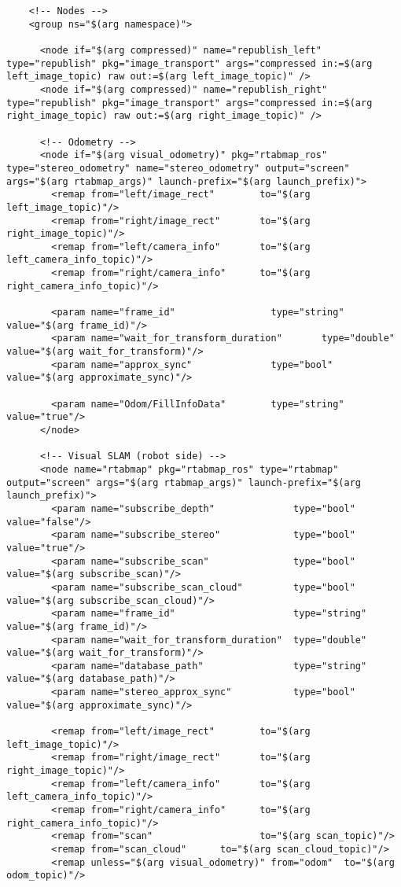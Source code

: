 \begin{center}
\begin{footnotesize}
\begin{verbatim}
    <!-- Nodes -->
    <group ns="$(arg namespace)">
    
      <node if="$(arg compressed)" name="republish_left"  type="republish" pkg="image_transport" args="compressed in:=$(arg left_image_topic) raw out:=$(arg left_image_topic)" />
      <node if="$(arg compressed)" name="republish_right" type="republish" pkg="image_transport" args="compressed in:=$(arg right_image_topic) raw out:=$(arg right_image_topic)" />
    
      <!-- Odometry -->
      <node if="$(arg visual_odometry)" pkg="rtabmap_ros" type="stereo_odometry" name="stereo_odometry" output="screen" args="$(arg rtabmap_args)" launch-prefix="$(arg launch_prefix)">
        <remap from="left/image_rect"        to="$(arg left_image_topic)"/>
        <remap from="right/image_rect"       to="$(arg right_image_topic)"/>
        <remap from="left/camera_info"       to="$(arg left_camera_info_topic)"/>
        <remap from="right/camera_info"      to="$(arg right_camera_info_topic)"/>
      
        <param name="frame_id"                 type="string" value="$(arg frame_id)"/>
        <param name="wait_for_transform_duration"       type="double"   value="$(arg wait_for_transform)"/>
        <param name="approx_sync"              type="bool"   value="$(arg approximate_sync)"/>
      
        <param name="Odom/FillInfoData"        type="string" value="true"/> 
      </node>
    
      <!-- Visual SLAM (robot side) -->
      <node name="rtabmap" pkg="rtabmap_ros" type="rtabmap" output="screen" args="$(arg rtabmap_args)" launch-prefix="$(arg launch_prefix)">
        <param name="subscribe_depth"              type="bool"   value="false"/>
        <param name="subscribe_stereo"             type="bool"   value="true"/>
        <param name="subscribe_scan"               type="bool"   value="$(arg subscribe_scan)"/>
        <param name="subscribe_scan_cloud"         type="bool"   value="$(arg subscribe_scan_cloud)"/>
        <param name="frame_id"                     type="string" value="$(arg frame_id)"/>
        <param name="wait_for_transform_duration"  type="double"   value="$(arg wait_for_transform)"/>
        <param name="database_path"                type="string" value="$(arg database_path)"/>
        <param name="stereo_approx_sync"           type="bool"   value="$(arg approximate_sync)"/>
    
        <remap from="left/image_rect"        to="$(arg left_image_topic)"/>
        <remap from="right/image_rect"       to="$(arg right_image_topic)"/>
        <remap from="left/camera_info"       to="$(arg left_camera_info_topic)"/>
        <remap from="right/camera_info"      to="$(arg right_camera_info_topic)"/>
        <remap from="scan"                   to="$(arg scan_topic)"/>
        <remap from="scan_cloud"      to="$(arg scan_cloud_topic)"/>
        <remap unless="$(arg visual_odometry)" from="odom"  to="$(arg odom_topic)"/>
        

\end{verbatim}
\end{footnotesize}
\end{center}

